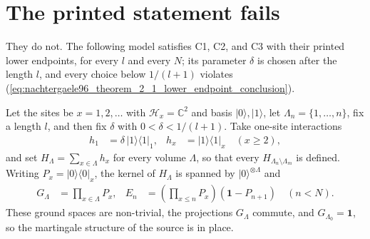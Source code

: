 \documentclass{article}
\begin{document}
\section{The printed statement fails}

They do not. The following model satisfies C1, C2, and C3 with their printed
lower endpoints, for every $l$ and every $N$; its parameter $\delta$ is chosen
after the length $l$, and every choice below $1/(l+1)$ violates
(\ref{eq:nachtergaele96_theorem_2_1_lower_endpoint_conclusion}).

Let the sites be $x=1,2,\ldots$ with $\mathcal H_x=\mathbb C^2$ and basis
$\lvert0\rangle,\lvert1\rangle$, let $\Lambda_n=\{1,\ldots,n\}$, fix a length
$l$, and then fix $\delta$ with $0<\delta<1/(l+1)$. Take one-site
interactions
\begin{align}
    h_1
        &=\delta\,\lvert1\rangle\langle1\rvert_1,
    &
    h_x
        &=\lvert1\rangle\langle1\rvert_x
    \quad(x\geq2),
    \label{eq:nachtergaele96_theorem_2_1_lower_endpoint_model_interaction}
\end{align}
and set $H_\Lambda=\sum_{x\in\Lambda}h_x$ for every volume $\Lambda$, so that
every $H_{\Lambda_n\setminus\Lambda_m}$ is defined. Writing
$P_x=\lvert0\rangle\langle0\rvert_x$, the kernel of $H_\Lambda$ is spanned by
$\lvert0\rangle^{\otimes\Lambda}$ and
\begin{align}
    G_\Lambda
        &=\prod_{x\in\Lambda}P_x,
    &
    E_n
        &=\left(\prod_{x\leq n}P_x\right)\left(\mathbf 1-P_{n+1}\right)
    \quad(n<N).
    \label{eq:nachtergaele96_theorem_2_1_lower_endpoint_model_projections}
\end{align}
These ground spaces are non-trivial, the projections $G_\Lambda$ commute,
and $G_{\Lambda_0}=\mathbf 1$, so the martingale structure of the source is in
place.
\end{document}
